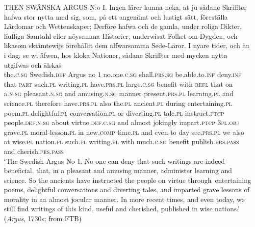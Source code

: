 \documentclass[output=paper]{langscibook}
\begin{document}
\ea        \label{ex:intro:3}
\gll  THEN   SWÄNSKA     ARGUS   N:o I.     Ingen         lärer  kunna         neka,     at     ju       sådane   Skriffter hafwa         stor       nytta     med   sig,   som,   på   ett     angenämt   och lustigt         sätt,     föreställa       Lärdomar   och Wettenskaper;   Derföre hafwa         och de     gamla,     under   roliga         Dikter, liufliga       Samtahl         eller   nöysamma   Historier, underwisat Folket           om   Dygden,        och   likasom   skiämtewijs   förehållit dem       alfwarsamma   Sede-Läror.      I  nyare       tider,    och   än     i   dag, se             wi   äfwen, hos kloka     Nationer,   sådane   Skriffter med   mycken     nytta       utgifwas         och   älskas\\
  the.\textsc{c.sg}   Swedish\textsc{.def} Argus   no 1  no.one.\textsc{c.sg}   shall\textsc{.prs.sg} be.able.to.\textsc{inf}  deny.\textsc{inf}   that   \textsc{part}  such.\textsc{pl}  writing.\textsc{pl}  have.\textsc{prs.pl}   large.\textsc{c.sg}  benefit  with  \textsc{refl}  that  on    a.\textsc{n.sg}  pleasant.\textsc{n.sg}  and amusing.\textsc{n.sg}   manner  present.\textsc{prs.pl}    learning.\textsc{pl}  and science.\textsc{pl}    therefore have.\textsc{prs.pl}   also the.\textsc{pl}  ancient\textsc{.pl}  during  entertaining.\textsc{pl}  poem.\textsc{pl} delightful.\textsc{pl}  conversation.\textsc{pl}   or    diverting.\textsc{pl}  tale.\textsc{pl}  instruct.\textsc{ptcp} people.\textsc{def.n.sg}  about  virtue.\textsc{def.c.sg}  and  almost  jokingly    impart.\textsc{ptcp} \textsc{3pl.obj}  grave.\textsc{pl}      moral-lesson\textsc{.pl}  in   new.\textsc{comp}  time.\textsc{pl}  and  even to   day see.\textsc{prs.pl}   we   also     at  wise.\textsc{pl}  nation.\textsc{pl}  such.\textsc{pl}   writing.\textsc{pl} with   much\textsc{.c.sg}   benefit   publish.\textsc{prs.pass}   and  cherish.\textsc{prs.pass}\\
\glt ‘The Swedish Argus No 1. No one can deny that such writings are indeed beneficial, that, in a pleasant and amusing manner, administer learning and science. So the ancients have instructed the people on virtue through~entertaining poems, delightful conversations and diverting tales, and imparted grave lessons of morality in an almost jocular manner. In more recent times, and even today, we still find writings of this kind, useful and cherished, published in wise nations.’ (\textit{Argus}, 1730s; from FTB)
\z
\end{document}
